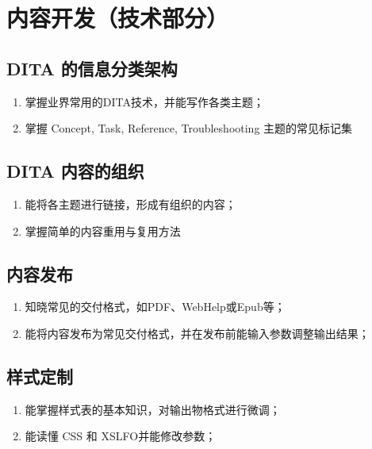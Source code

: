 \documentclass[letterpaper,10pt,english]{sphinxmanual}
\begin{document}
\section{内容开发（技术部分）}
\label{\detokenize{about/tw-comp-model:id9}}

\subsection{DITA 的信息分类架构}
\label{\detokenize{about/tw-comp-model:dita}}\begin{enumerate}
%
\item {} 
\sphinxAtStartPar
掌握业界常用的DITA技术，并能写作各类主题；

\item {} 
\sphinxAtStartPar
掌握 Concept, Task, Reference, Troubleshooting 主题的常见标记集

\end{enumerate}


\subsection{DITA 内容的组织}
\label{\detokenize{about/tw-comp-model:id10}}\begin{enumerate}
%
\item {} 
\sphinxAtStartPar
能将各主题进行链接，形成有组织的内容；

\item {} 
\sphinxAtStartPar
掌握简单的内容重用与复用方法

\end{enumerate}


\subsection{内容发布}
\label{\detokenize{about/tw-comp-model:id11}}\begin{enumerate}
%
\item {} 
\sphinxAtStartPar
知晓常见的交付格式，如PDF、WebHelp或Epub等；

\item {} 
\sphinxAtStartPar
能将内容发布为常见交付格式，并在发布前能输入参数调整输出结果；

\end{enumerate}


\subsection{样式定制}
\label{\detokenize{about/tw-comp-model:id12}}\begin{enumerate}
%
\item {} 
\sphinxAtStartPar
能掌握样式表的基本知识，对输出物格式进行微调；

\item {} 
\sphinxAtStartPar
能读懂 CSS 和 XSL\sphinxhyphen{}FO并能修改参数；

\end{enumerate}
\end{document}
